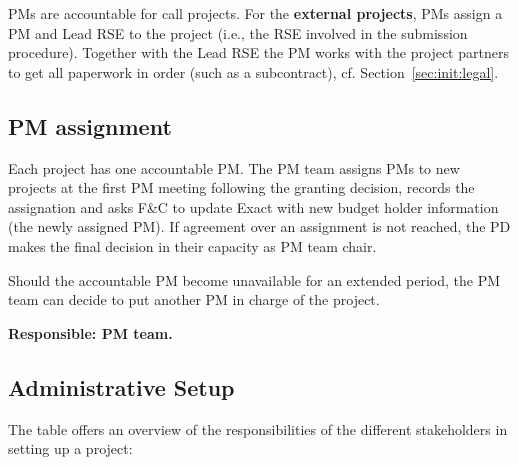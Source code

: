 \documentclass[11pt]{article}
\begin{document}
PMs are accountable for call projects. For the \textbf{external projects}, PMs assign a PM and Lead RSE to the project
(i.e., the RSE involved in the submission procedure). Together with the Lead RSE the PM works with the project partners
to get all paperwork in order (such as a subcontract), cf. Section~\ref{sec:init:legal}. 

\subsection{PM assignment}
Each project has one accountable PM. The PM team assigns PMs to new projects at the first PM meeting following the
granting decision, records the assignation and asks F\&C to update Exact with new budget holder information (the newly
assigned PM). If agreement over an assignment is not reached, the PD makes the final decision in their capacity as PM
team chair.

Should the accountable PM become unavailable for an extended period, the PM team can decide to put another PM in charge
of the project.

\textbf{Responsible: PM team.}

\subsection{Administrative Setup}
The table offers an overview of the responsibilities of the different stakeholders in setting up a project:
\end{document}
